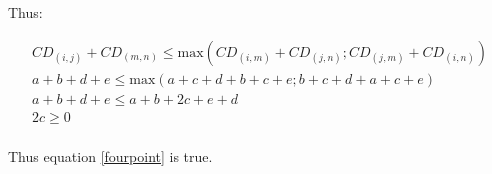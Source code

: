 \documentclass[12pt,letterpaper]{article}
\begin{document}
Thus:

\begin{equation}
    \begin{gathered}
    CD_{(i,j)} + CD_{(m,n)} \leq \text{max}{(CD_{(i,m)} + CD_{(j,n)} ; CD_{(j,m)} + CD_{(i,n)} )} \\ 
    a + b + d + e \leq \text{max} (a+c+d+b+c+e; b+c+d+a+c+e) \\
    a + b + d + e \leq a+b+2c+e+d \\
    2c \geq 0 \\
    \end{gathered}
\end{equation}

Thus equation \ref{fourpoint} is true.







\end{document}
